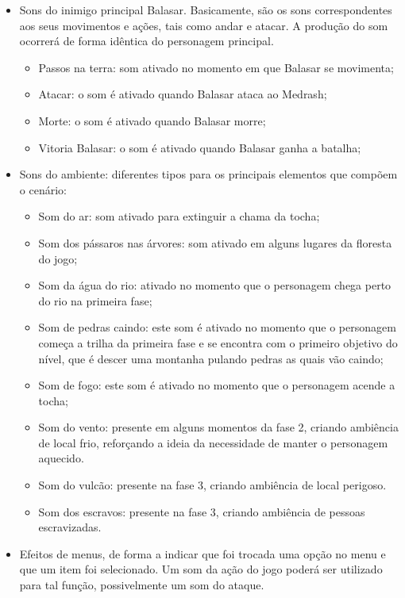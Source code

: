 \begin{itemize}
\item Sons do inimigo principal Balasar. Basicamente, são os sons correspondentes
 aos seus movimentos e ações, tais como andar e atacar. A
 produção do som ocorrerá de forma idêntica do personagem principal.

\begin{itemize}
\item Passos na terra: som ativado no momento em que Balasar se
 movimenta;
\item Atacar: o som é ativado quando Balasar ataca ao Medrash;
\item Morte: o som é ativado quando Balasar morre;
\item Vitoria Balasar: o som é ativado quando Balasar ganha a batalha;
\end{itemize}





\item Sons do ambiente: diferentes tipos para os principais elementos que
 compõem o cenário:

\begin{itemize}
\item Som do ar: som ativado para extinguir a chama da tocha;
\item Som dos pássaros nas árvores: som ativado em alguns lugares 
da floresta do jogo;
\item Som da água do rio: ativado no momento que o personagem chega 
perto do rio na primeira fase;
\item Som de pedras caindo: este som é ativado no momento que o personagem 
começa a trilha da primeira fase e se encontra com o primeiro objetivo do 
nível, que é descer uma montanha pulando pedras as quais vão caindo;
\item Som de fogo: este som é ativado no momento que o personagem 
acende a tocha;
\item Som do vento: presente em alguns momentos da fase 2, criando 
ambiência de local frio, reforçando a ideia da necessidade de manter
 o personagem aquecido.
\item Som do vulcão: presente na fase 3, criando ambiência de local perigoso.
\item Som dos escravos: presente na fase 3, criando ambiência de pessoas escravizadas.

\end{itemize}

\item Efeitos de menus, de forma a indicar que foi trocada uma opção no 
menu e que um item foi selecionado. Um som da ação do jogo poderá ser
 utilizado para tal função, possivelmente um som do ataque.
 
\end{itemize}

